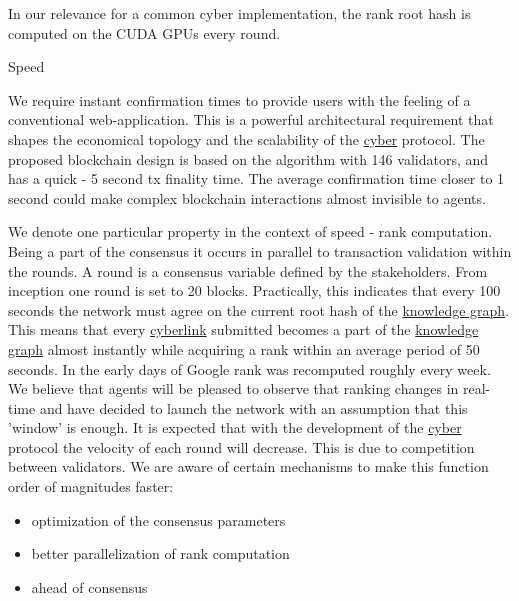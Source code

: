 \documentclass[8pt,oneside]{amsart}
\makeatletter
\newcommand{\linkred}[2]{\href{#1}{\color{red}{#2}}}
\newcommand{\linkgreen}[2]{\href{#1}{\color{green}{#2}}}
\renewcommand\subsection{\@startsection{subsection}
                                    {2}{\z@}
                                    {-3.25ex\@plus -1ex \@minus -.2ex}
                                    {0ex \@plus .2ex}
                                    {\play\Large}
                        }
\newcommand{\titleSection}[1]{\subsection{#1}}
\newcommand{\code}[1]{{\PlayBold #1}}
\makeatother
\begin{document}
In our relevance for a common \code{cyber} implementation, the rank root hash is computed on the CUDA GPUs every round.

\titleSection{Speed}\label{speed}

We require instant confirmation times to provide users with the feeling of a conventional web-application. This is a powerful architectural requirement that shapes the economical topology and the scalability of the {\hyperref[cyber]{cyber}} protocol. The proposed blockchain design is based on the \linkgreen{https://ipfs.io/ipfs/QmaMtD7xDgghqgjN62zWZ5TBGFiEjGQtuZBjJ9sMh816KJ}{Tendermint consensus} algorithm with 146 validators, and has a quick - 5 second tx finality time. The average confirmation time closer to 1 second could make complex blockchain interactions almost invisible to agents.

We denote one particular \linkred{https://github.com/cybercongress/cyberd}{cyberd} property in the context of speed - rank computation. Being a part of the consensus it occurs in parallel to transaction validation within the rounds. A round is a consensus variable defined by the stakeholders. From inception one round is set to 20 blocks. Practically, this indicates that every 100 seconds the network must agree on the current root hash of the {\hyperref[knowledge-graph]{knowledge graph}}. This means that every {\hyperref[cyberlinks]{cyberlink}} submitted becomes a part of the {\hyperref[knowledge-graph]{knowledge graph}} almost instantly while acquiring a rank within an average period of 50 seconds. In the early days of Google rank was recomputed roughly every week. We believe that agents will be pleased to observe that ranking changes in real-time and have decided to launch the network with an assumption that this 'window' is enough. It is expected that with the development of the {\hyperref[cyber]{cyber}} protocol the velocity of each round will decrease. This is due to competition between validators. We are aware of certain mechanisms to make this function order of magnitudes faster:

\begin{itemize}
\item optimization of the consensus parameters
\item better parallelization of rank computation
\item \linkred{https://medium.com/solana-labs/proof-of-history-a-clock-for-blockchain-cf47a61a9274}{a better clock} ahead of consensus
\end{itemize}
\end{document}
